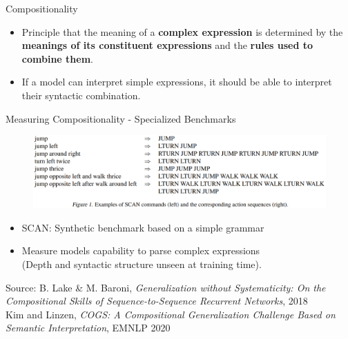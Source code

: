 \documentclass{beamer}
\begin{document}
\begin{frame}{Compositionality}
    \begin{itemize}
        \item Principle that the meaning of a \textbf{complex expression} is determined by the \textbf{meanings of its constituent expressions} and the \textbf{rules used to combine them}. 
        \item If a model can interpret simple expressions, it should be able to interpret their syntactic combination.
    \end{itemize}
\end{frame}

\begin{frame}{Measuring Compositionality - Specialized Benchmarks}
    \begin{figure}
        \centering
        \includegraphics[width=\textwidth]{scan.png}
    \end{figure}
    \begin{itemize}
        \item SCAN: Synthetic benchmark based on a simple grammar
        \item Measure models capability to parse complex expressions\\(Depth and syntactic structure unseen at training time).
    \end{itemize}

    \vfill
    
    \tiny{Source: B. Lake \& M. Baroni, \emph{Generalization without Systematicity: On the Compositional Skills of Sequence-to-Sequence Recurrent Networks}, 2018}\\
    \tiny{Kim and Linzen, \textit{COGS: A Compositional Generalization Challenge Based on Semantic Interpretation}, EMNLP 2020}
\end{frame}
\end{document}
